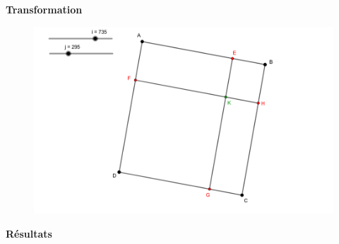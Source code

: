 \documentclass{beamer}
\begin{document}
\begin{frame}[t]
\begin{columns}[t]
\begin{column}{.5\linewidth}
                \vspace{1em}


                \begin{block}{\centering \textbf{Transformation}}
                    \vspace{.5em}

                    \begin{figure}[t]
                        \includegraphics[width=.5\linewidth]{rsc/transform_formula.png}\\
                    \end{figure}

                    \vspace{.5em}
                \end{block}

                \vspace{1em}


                \begin{block}{\centering \textbf{Résultats}}
                    \vspace{.5em}


\end{block}
\end{column}
\end{columns}
\end{frame}
\end{document}
